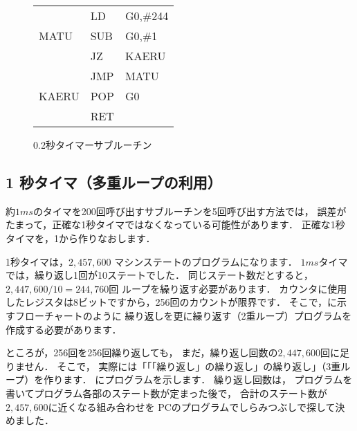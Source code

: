 \begin{figure}[btp]
{\begin{center}
\begin{tabular}{|l|l l|}
      & LD   & G0,\#244                            \\
MATU  & SUB  & G0,\#1                              \\
      & JZ   & KAERU                               \\
      & JMP  & MATU                                \\
KAERU & POP  & G0                                  \\
      & RET  &                                     \\
\hline
\end{tabular}
\end{center}}
\caption{0.2秒タイマーサブルーチン}
\label{fig:chap6:200ms}
\end{figure}

\subsection{1 秒タイマ（多重ループの利用）}

約$1ms$のタイマを200回呼び出すサブルーチンを5回呼び出す方法では，
誤差がたまって，正確な1秒タイマではなくなっている可能性があります．
正確な1秒タイマを，1から作りなおします．

1秒タイマは，$2,457,600$ マシンステートのプログラムになります．
$1ms$タイマでは，繰り返し1回が10ステートでした．
同じステート数だとすると，
$2,447,600 / 10 = 244,760回$ ループを繰り返す必要があります．
カウンタに使用したレジスタは8ビットですから，256回のカウントが限界です．
そこで，に示すフローチャートのように
繰り返しを更に繰り返す（2重ループ）プログラムを作成する必要があります．


ところが，256回を256回繰り返しても，
まだ，繰り返し回数の$2,447,600回$に足りません．
そこで，
実際には「「「繰り返し」の繰り返し」の繰り返し」（3重ループ）を作ります．
にプログラムを示します．
繰り返し回数は，
プログラムを書いてプログラム各部のステート数が定まった後で，
合計のステート数が$2,457,600$に近くなる組み合わせを
PCのプログラムでしらみつぶしで探して決めました．

%

